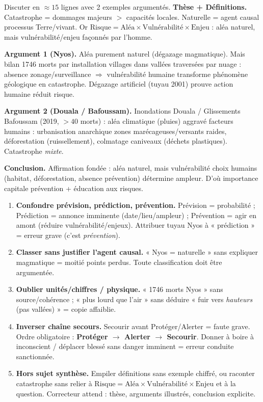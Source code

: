 \documentclass[11pt]{article}
\begin{document}
\begin{exoresolu}
Discuter en $\approx 15$ lignes avec 2 exemples argumentés.
\tcblower
\textbf{Thèse + Définitions.} Catastrophe = dommages majeurs $>$ capacités locales. Naturelle = agent causal processus Terre/vivant. Or $\text{Risque} = \text{Aléa} \times \text{Vulnérabilité} \times \text{Enjeu}$ : aléa naturel, mais vulnérabilité/enjeu façonnés par l'homme.

\textbf{Argument 1 (Nyos).} Aléa purement naturel (dégazage  magmatique). Mais bilan 1746 morts par installation villages dans vallées traversées par nuage : absence zonage/surveillance $\Rightarrow$ vulnérabilité humaine transforme phénomène géologique en catastrophe. Dégazage artificiel (tuyau 2001) prouve action humaine réduit risque.

\textbf{Argument 2 (Douala / Bafoussam).} Inondations Douala / Glissements Bafoussam (2019, $>40$ morts) : aléa climatique (pluies) aggravé facteurs humains : urbanisation anarchique zones marécageuses/versants raides, déforestation (ruissellement), colmatage caniveaux (déchets plastiques). Catastrophe \emph{mixte}.

\textbf{Conclusion.} Affirmation fondée : aléa naturel, mais vulnérabilité choix humains (habitat, déforestation, absence prévention) détermine ampleur. D'où importance capitale prévention + éducation aux risques.
\end{exoresolu}

\begin{attention}
\begin{enumerate}
\item \textbf{Confondre prévision, prédiction, prévention.} Prévision = probabilité ; Prédiction = annonce imminente (date/lieu/ampleur) ; Prévention = agir en amont (réduire vulnérabilité/enjeux). Attribuer tuyau Nyos à « prédiction » = erreur grave (c'est \emph{prévention}).
\item \textbf{Classer sans justifier l'agent causal.} « Nyos = naturelle » sans expliquer  magmatique = moitié points perdus. Toute classification doit être argumentée.
\item \textbf{Oublier unités/chiffres / physique.} « 1746 morts Nyos » sans source/cohérence ; «  plus lourd que l'air » sans déduire « fuir vers \emph{hauteurs} (pas vallées) » = copie affaiblie.
\item \textbf{Inverser chaîne secours.} Secourir avant Protéger/Alerter = faute grave. Ordre obligatoire : \textbf{Protéger $\rightarrow$ Alerter $\rightarrow$ Secourir}. Donner à boire à inconscient / déplacer blessé sans danger imminent = erreur conduite sanctionnée.
\item \textbf{Hors sujet synthèse.} Empiler définitions sans exemple chiffré, ou raconter catastrophe sans relier à $\text{Risque} = \text{Aléa} \times \text{Vulnérabilité} \times \text{Enjeu}$ et à la question. Correcteur attend : thèse, arguments illustrés, conclusion explicite.
\end{enumerate}
\end{attention}
\end{document}
